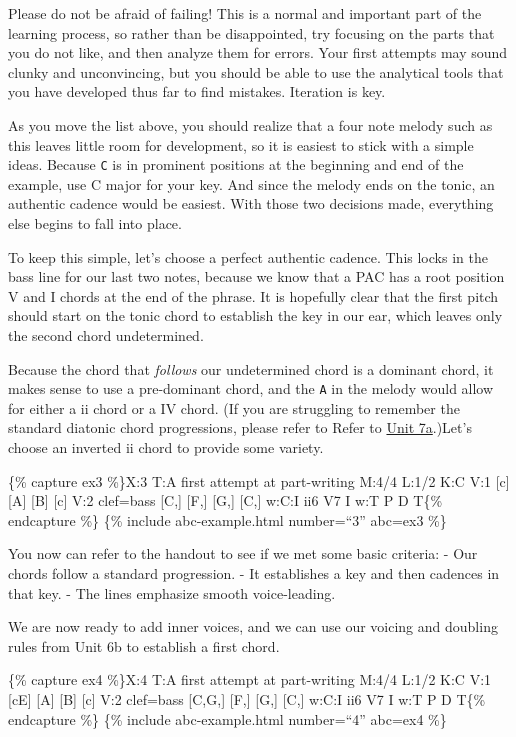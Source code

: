 \documentclass{book}
\begin{document}
Please do not be afraid of failing! This is a normal and important part of the
learning process, so rather than be disappointed, try focusing on the parts
that you do not like, and then analyze them for errors. Your first attempts
may sound clunky and unconvincing, but you should be able to use the
analytical tools that you have developed thus far to find mistakes. Iteration
is key.

As you move the list above, you should realize that a four note melody such as
this leaves little room for development, so it is easiest to stick with a
simple ideas. Because \texttt{C} is in prominent positions at the beginning
and end of the example, use C major for your key. And since the melody ends on
the tonic, an authentic cadence would be easiest. With those two decisions
made, everything else begins to fall into place.

To keep this simple, let's choose a perfect authentic cadence. This locks in
the bass line for our last two notes, because we know that a PAC has a root
position V and I chords at the end of the phrase. It is hopefully clear that
the first pitch should start on the tonic chord to establish the key in our
ear, which leaves only the second chord undetermined.

Because the chord that \emph{follows} our undetermined chord is a dominant
chord, it makes sense to use a pre-dominant chord, and the \texttt{A} in the
melody would allow for either a ii chord or a IV chord. (If you are struggling
to remember the standard diatonic chord progressions, please refer to Refer to
\href{07-harmonic-functions/a1-diaprogcirclefifths.html}{Unit 7a}.)Let's
choose an inverted ii chord to provide some variety.

\{\% capture ex3 \%\}X:3 T:A first attempt at part-writing M:4/4 L:1/2 K:C V:1
{[}c{]} {[}A{]}\textbar{} {[}B{]} {[}c{]}\textbar{]} V:2 clef=bass {[}C,{]}
{[}F,{]} \textbar{} {[}G,{]} {[}C,{]}\textbar{]} w:C:I ii6 V7 I w:T P D T\{\%
endcapture \%\} \{\% include abc-example.html number=``3'' abc=ex3 \%\}

You now can refer to the handout to see if we met some basic criteria: - Our
chords follow a standard progression. - It establishes a key and then cadences
in that key. - The lines emphasize smooth voice-leading.

We are now ready to add inner voices, and we can use our voicing and doubling
rules from Unit 6b to establish a first chord.

\{\% capture ex4 \%\}X:4 T:A first attempt at part-writing M:4/4 L:1/2 K:C V:1
{[}cE{]} {[}A{]}\textbar{} {[}B{]} {[}c{]}\textbar{]} V:2 clef=bass {[}C,G,{]}
{[}F,{]} \textbar{} {[}G,{]} {[}C,{]}\textbar{]} w:C:I ii6 V7 I w:T P D T\{\%
endcapture \%\} \{\% include abc-example.html number=``4'' abc=ex4 \%\}
\end{document}
